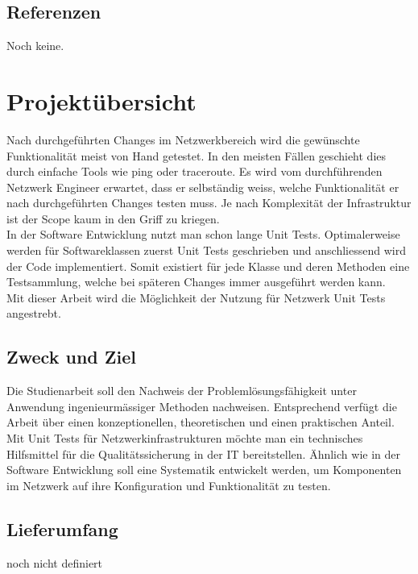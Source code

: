 \documentclass[a4,12pt]{scrartcl}
\begin{document}
\subsection{Referenzen}
\begin{description}
Noch keine.
\end{description}

\section{Projektübersicht}
Nach durchgeführten Changes im Netzwerkbereich wird die gewünschte Funktionalität meist von Hand getestet. In den meisten Fällen geschieht dies durch einfache Tools wie ping oder traceroute. Es wird vom durchführenden Netzwerk Engineer erwartet, dass er selbständig weiss, welche Funktionalität er nach durchgeführten Changes testen muss. Je nach Komplexität der Infrastruktur ist der Scope kaum in den Griff zu kriegen. \\

\noindent In der Software Entwicklung nutzt man schon lange Unit Tests. Optimalerweise werden für Softwareklassen zuerst Unit Tests geschrieben und anschliessend wird der Code implementiert. Somit existiert für jede Klasse und deren Methoden eine Testsammlung, welche bei späteren Changes immer ausgeführt werden kann. \\

\noindent Mit dieser Arbeit wird die Möglichkeit der Nutzung für Netzwerk Unit Tests angestrebt.
\subsection{Zweck und Ziel}
Die Studienarbeit soll den Nachweis der Problemlösungsfähigkeit unter Anwendung ingenieurmässiger Methoden nachweisen. Entsprechend verfügt die Arbeit über einen konzeptionellen, theoretischen und einen praktischen Anteil.\\

\noindent Mit Unit Tests für Netzwerkinfrastrukturen möchte man ein technisches Hilfsmittel für die Qualitätssicherung in der IT bereitstellen. Ähnlich wie in der Software Entwicklung soll eine Systematik entwickelt werden, um Komponenten im Netzwerk auf ihre Konfiguration und Funktionalität zu testen. 
\subsection{Lieferumfang}
noch nicht definiert
\end{document}
